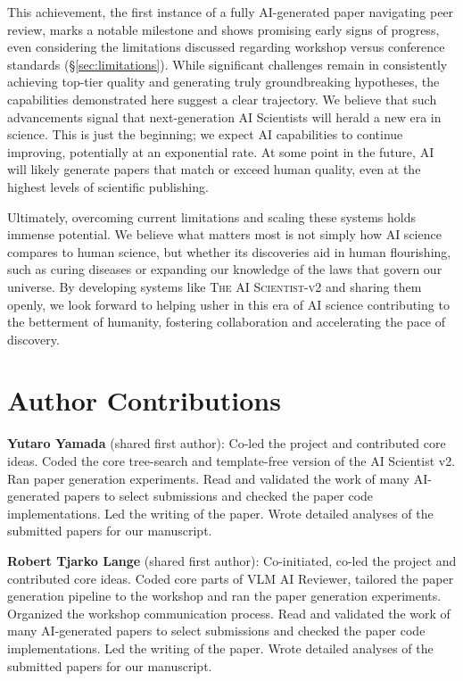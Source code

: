 \documentclass[11pt, a4paper]{include/gdm_format}
\newcommand{\ouralgo}{\textsc{The AI Scientist-v2}\xspace}
\begin{document}
This achievement, the first instance of a fully AI-generated paper navigating peer review, marks a notable milestone and shows promising early signs of progress, even considering the limitations discussed regarding workshop versus conference standards (\S\ref{sec:limitations}). While significant challenges remain in consistently achieving top-tier quality and generating truly groundbreaking hypotheses, the capabilities demonstrated here suggest a clear trajectory. We believe that such advancements signal that next-generation AI Scientists will herald a new era in science. This is just the beginning; we expect AI capabilities to continue improving, potentially at an exponential rate. At some point in the future, AI will likely generate papers that match or exceed human quality, even at the highest levels of scientific publishing.

Ultimately, overcoming current limitations and scaling these systems holds immense potential. We believe what matters most is not simply how AI science compares to human science, but whether its discoveries aid in human flourishing, such as curing diseases or expanding our knowledge of the laws that govern our universe. By developing systems like \ouralgo and sharing them openly, we look forward to helping usher in this era of AI science contributing to the betterment of humanity, fostering collaboration and accelerating the pace of discovery.




\clearpage
\section*{Author Contributions}
\label{appsec:contribs}

\textbf{Yutaro Yamada} (shared first author): Co-led the project and contributed core ideas. Coded the core tree-search and template-free version of the AI Scientist v2. Ran paper generation experiments. Read and validated the work of many AI-generated papers to select submissions and checked the paper code implementations. Led the writing of the paper. Wrote detailed analyses of the submitted papers for our manuscript.

\textbf{Robert Tjarko Lange} (shared first author): Co-initiated, co-led the project and contributed core ideas. Coded core parts of VLM AI Reviewer, tailored the paper generation pipeline to the workshop and ran the paper generation experiments. Organized the workshop communication process. Read and validated the work of many AI-generated papers to select submissions and checked the paper code implementations. Led the writing of the paper. Wrote detailed analyses of the submitted papers for our manuscript.
\end{document}
